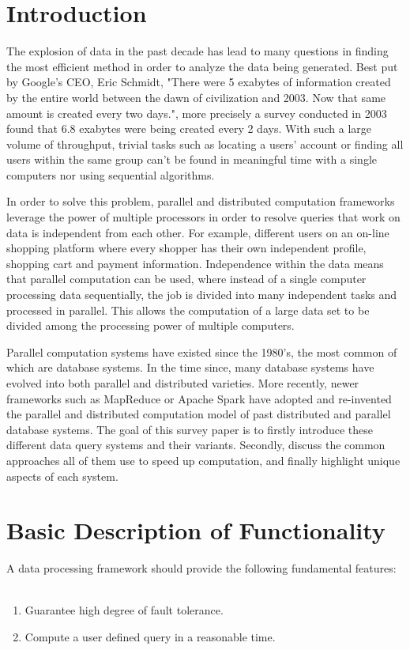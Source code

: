 \documentclass[10pt,twocolumn]{IEEEtran11}
\begin{document}
\section{Introduction}
The explosion of data in the past decade has lead to many questions in finding the most efficient method in order to analyze the data being generated. Best put by Google's CEO, Eric Schmidt, "There were 5 exabytes of information created by the entire world between the dawn of civilization and 2003. Now that same amount is created every two days.", more precisely a survey conducted in 2003 found that 6.8 exabytes were being created every 2 days\cite{gantz2010digital}.  With such a large volume of throughput, trivial tasks such as locating a users' account or finding all users within the same group can't be found in meaningful time with a single computers nor using sequential algorithms.
\par
In order to solve this problem, parallel and distributed computation frameworks leverage the power of multiple processors in order to resolve queries that work on data is independent from each other.  For example,  different users on an on-line shopping platform where every shopper has their own independent profile, shopping cart and payment information.  Independence within the data means that parallel computation can be used, where instead of a single computer processing data sequentially, the job is divided into many independent tasks and processed in parallel.  This allows the computation of a large data set to be divided among the processing power of multiple computers.
\par
Parallel computation systems have existed since the 1980's, the most common of which are database systems. In the time since, many database systems have evolved into both parallel and distributed varieties.  More recently, newer frameworks such as  MapReduce or Apache Spark have adopted and re-invented the parallel and distributed computation model of past distributed and parallel database systems.  The goal of this survey paper is to firstly introduce these different data query systems and their variants.  Secondly, discuss the common approaches all of them use to speed up computation, and finally highlight unique aspects of each system.

\section{Basic Description of Functionality}

A data processing framework should provide the following fundamental features:
\ \\
\begin{enumerate}	
\setlength\itemsep{1em}
	\item Guarantee high degree of fault tolerance.
	\item Compute a user defined query in a reasonable time.
\end{enumerate}
\end{document}
